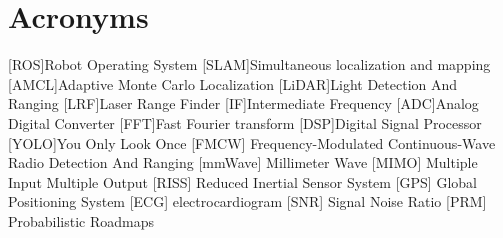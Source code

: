 \chapter*{Acronyms}
	\begin{acronym}[RELAX NG]
	[ROS]{Robot Operating System}
	[SLAM]{Simultaneous localization and mapping}
    [AMCL]{Adaptive Monte Carlo Localization}
    [LiDAR]{Light Detection And Ranging}
	[LRF]{Laser Range Finder}
	[IF]{Intermediate Frequency}
	[ADC]{Analog Digital Converter}
	[FFT]{Fast Fourier transform}
    [DSP]{Digital Signal Processor}
	[YOLO]{You Only Look Once}
	 [FMCW] {Frequency-Modulated Continuous-Wave}
	 {Radio Detection And Ranging}
	[mmWave] {Millimeter Wave}
	[MIMO] {Multiple Input Multiple Output}
	[RISS] {Reduced Inertial Sensor System}
	[GPS] {Global Positioning System}
	[ECG] {electrocardiogram}
	[SNR] {Signal Noise Ratio}
	[PRM] {Probabilistic Roadmaps}
	\end{acronym}